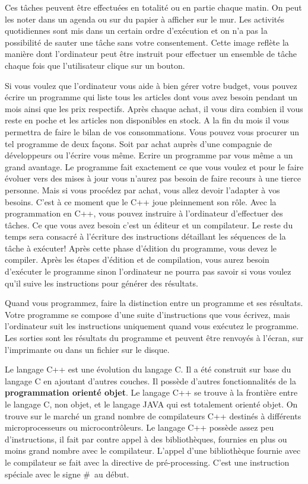 \documentclass[a4paper, oneside,11pt]{book}
\begin{document}
Ces t\^aches peuvent \^etre effectu\'ees en totalit\'e ou en partie chaque matin. On peut les noter dans un agenda ou sur du papier \`a afficher sur le mur. 
Les activit\'es quotidiennes sont mis dans un certain ordre d'ex\'ecution et on n'a pas la possibilit\'e de sauter une t\^ache sans votre consentement. Cette image  
refl\`ete la mani\`ere dont l'ordinateur peut \^etre instruit pour effectuer un ensemble de t\^ache chaque fois que l'utilisateur clique sur un bouton. 

Si vous voulez que l'ordinateur vous aide \`a bien g\'erer votre budget, vous pouvez \'ecrire un programme qui liste tous les articles dont vous avez besoin pendant 
un mois ainsi que les prix respectifs. Apr\`es chaque achat, il vous dira combien il vous reste en poche et les articles non disponibles en stock. A la fin du mois il 
vous permettra de faire le bilan de vos consommations. Vous pouvez vous procurer un tel programme de deux fa\c{c}ons. Soit par achat aupr\`es d'une compagnie de 
d\'eveloppeurs ou l'\'ecrire vous m\^eme. Ecrire un programme par vous m\^eme a un grand avantage. Le programme fait exactement ce que vous voulez et pour le faire \'evoluer vers des 
mises \`a jour vous n'aurez pas besoin de faire recours \`a une tierce personne. Mais si vous proc\'edez par achat, vous allez devoir l'adapter \`a vos 
besoins. C'est \`a ce moment que le C++ joue pleinnement son r\^ole. Avec la programmation en C++,
vous  pouvez instruire \`a l'ordinateur d'effectuer des t\^aches. Ce  que vous avez besoin c'est un \'editeur et un compilateur. Le reste du temps sera consacr\'e \`a l'\'ecriture 
des instructions d\'etaillant les s\'equences de la t\^ache \`a ex\'ecuter! Apr\`es cette phase d'\'edition du programme, vous devez le compiler. 
Apr\`es les \'etapes d'\'edition et de compilation, vous aurez besoin d'ex\'ecuter le programme sinon l'ordinateur ne pourra pas savoir si vous voulez qu'il 
suive les instructions pour g\'en\'erer  des r\'esultats.

Quand vous programmez, faire la distinction entre un programme et ses r\'esultats. Votre programme se compose d'une suite d'instructions que vous \'ecrivez, mais l'ordinateur
suit les instructions uniquement quand vous ex\'ecutez le programme. Les sorties sont les r\'esultats du programme et peuvent \^etre renvoy\'es \`a l'\'ecran, sur l'imprimante ou 
dans un fichier sur le disque.

Le langage C++ est une \'evolution du langage C. Il a \'et\'e construit sur base du langage C en ajoutant d'autres couches. Il poss\`ede d'autres fonctionnalit\'es de la 
\textbf{programmation orient\'e objet}. Le langage C++ se trouve \`a la fronti\`ere entre le langage C, non objet, et le langage JAVA qui est totalement orient\'e objet.
On trouve sur le march\'e un grand nombre de compilateurs C++ destin\'es \`a diff\'erents microprocesseurs ou microcontr\^oleurs.
Le langage C++ poss\`ede assez peu d'instructions, il fait par contre appel \`a des biblioth\`eques, fournies en plus ou moins grand nombre avec le compilateur. 
L'appel d'une biblioth\`eque fournie  avec le compilateur se fait avec la directive de pr\'e-processing. C'est une instruction sp\'eciale  avec le signe \og\#\fg\ au d\'ebut.
\end{document}
